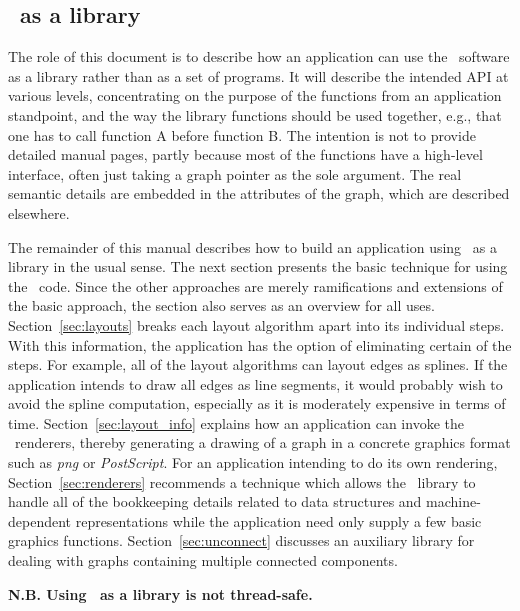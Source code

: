 \subsection{\gviz\ as a library}
The role of this document is to describe how an application can use the
\gviz\ software as a library rather than as a set of programs. It will
describe the intended API at various levels, concentrating on the purpose
of the functions from an application standpoint, and the way the 
library functions should be used together, e.g., that one has to call
function A before function B. The intention is not to provide
detailed manual pages, partly because most of the functions have a high-level 
interface, often just taking a graph pointer as the sole argument.
The real semantic details are embedded in the
attributes of the graph, which are described elsewhere. 

The remainder of this manual describes how to build an application
using \gviz\ as a library in the usual sense.
The next section presents the basic technique for using the \gviz\ code. Since
the other approaches are merely ramifications and extensions of the
basic approach, the section also serves as an overview for all uses.
Section~\ref{sec:layouts} breaks each layout algorithm apart into 
its individual steps.
With this information, the application has the option of eliminating
certain of the steps. For example, all of the layout algorithms can 
layout edges as splines. If the application intends to draw all edges
as line segments, it would probably wish to avoid the spline computation,
especially as it is moderately expensive in terms of time. 
Section~\ref{sec:layout_info} explains how an application can invoke the
\gviz\ renderers, thereby generating a drawing of a graph in 
a concrete graphics format such as {\em png} or {\em PostScript}.
For an application intending to do its own rendering,
Section~\ref{sec:renderers} recommends a technique which allows the
\gviz\ library to handle all of the bookkeeping details related to
data structures and machine-dependent representations while the
application need only supply a few basic graphics functions.
Section~\ref{sec:unconnect}
discusses an auxiliary library for dealing with graphs containing
multiple connected components.

{\bf N.B. Using \gviz\ as a library is not thread-safe.}
